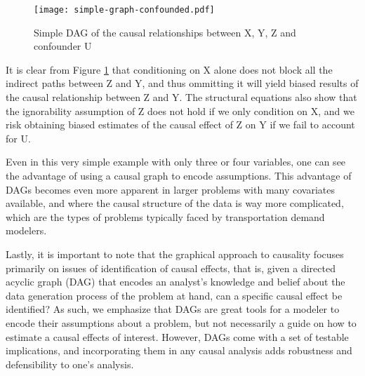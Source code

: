 \begin{figure}
   \centering
   \texttt{[image: simple-graph-confounded.pdf]}
   \caption{Simple DAG of the causal relationships between X, Y, Z and confounder U}
   \label{fig:simple-graph-confounded}
\end{figure}

It is clear from Figure \ref{fig:simple-graph-confounded} that conditioning on X alone does not block all the indirect paths between Z and Y, and thus ommitting it 
will yield biased results of the causal relationship between Z and Y. The structural equations also show that the ignorability assumption 
of Z does not hold if we only condition on X, and we risk obtaining biased estimates of the causal effect of Z on Y if we fail to 
account for U. 

Even in this very simple example with only three or four variables, one can see the advantage of using a causal graph to encode assumptions. 
This advantage of DAGs becomes even more apparent in larger problems with many covariates available, and where the causal structure of the data is way more complicated, which are the types of problems typically faced by transportation demand modelers. 



Lastly, it is important to note that the graphical approach to causality focuses 
primarily on issues of identification of causal effects, that is, given a 
directed acyclic graph (DAG) that encodes an analyst's knowledge and belief 
about the data generation process of the problem at hand, can a specific 
causal effect be identified? As such, we emphasize that DAGs are great tools 
for a modeler to encode their assumptions about a problem, but not necessarily 
a guide on how to estimate a causal effects of interest. However, DAGs come 
with a set of testable implications, and incorporating them in any causal 
analysis adds robustness and defensibility to one's analysis. 






